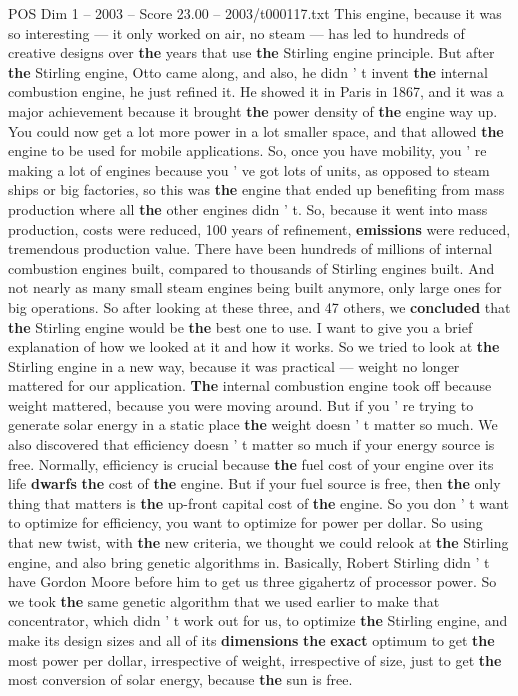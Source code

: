 \begin{textsample}{POS Dim 1 – 2003 – Score 23.00 – 2003/t000117.txt}
This engine, because it was so interesting — it only worked on air, no steam — has led to hundreds of creative designs over \textbf{the} years that use \textbf{the} Stirling engine principle.
But after \textbf{the} Stirling engine, Otto came along, and also, he didn ' t invent \textbf{the} internal combustion engine, he just refined it.
He showed it in Paris in 1867, and it was a major achievement because it brought \textbf{the} power density of \textbf{the} engine way up.
You could now get a lot more power in a lot smaller space, and that allowed \textbf{the} engine to be used for mobile applications.
So, once you have mobility, you ' re making a lot of engines because you ' ve got lots of units, as opposed to steam ships or big factories, so this was \textbf{the} engine that ended up benefiting from mass production where all \textbf{the} other engines didn ' t.
So, because it went into mass production, costs were reduced, 100 years of refinement, \textbf{emissions} were reduced, tremendous production value.
There have been hundreds of millions of internal combustion engines built, compared to thousands of Stirling engines built.
And not nearly as many small steam engines being built anymore, only large ones for big operations.
So after looking at these three, and 47 others, we \textbf{concluded} that \textbf{the} Stirling engine would be \textbf{the} best one to use.
I want to give you a brief explanation of how we looked at it and how it works.
So we tried to look at \textbf{the} Stirling engine in a new way, because it was practical — weight no longer mattered for our application. \textbf{The} internal combustion engine took off because weight mattered, because you were moving around.
But if you ' re trying to generate solar energy in a static place \textbf{the} weight doesn ' t matter so much.
We also discovered that efficiency doesn ' t matter so much if your energy source is free.
Normally, efficiency is crucial because \textbf{the} fuel cost of your engine over its life \textbf{dwarfs} \textbf{the} cost of \textbf{the} engine.
But if your fuel source is free, then \textbf{the} only thing that matters is \textbf{the} up-front capital cost of \textbf{the} engine.
So you don ' t want to optimize for efficiency, you want to optimize for power per dollar.
So using that new twist, with \textbf{the} new criteria, we thought we could relook at \textbf{the} Stirling engine, and also bring genetic algorithms in.
Basically, Robert Stirling didn ' t have Gordon Moore before him to get us three gigahertz of processor power.
So we took \textbf{the} same genetic algorithm that we used earlier to make that concentrator, which didn ' t work out for us, to optimize \textbf{the} Stirling engine, and make its design sizes and all of its \textbf{dimensions} \textbf{the} \textbf{exact} optimum to get \textbf{the} most power per dollar, irrespective of weight, irrespective of size, just to get \textbf{the} most conversion of solar energy, because \textbf{the} sun is free.

\end{textsample}
